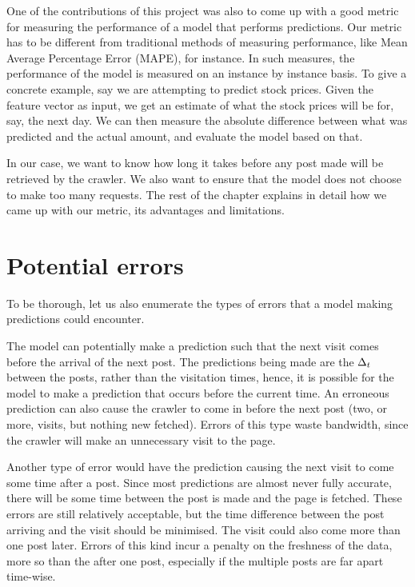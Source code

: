 One of the contributions of this project was also to come up with a good metric 
for measuring the performance of a model that performs predictions. Our metric 
has to be different from traditional methods of measuring performance, like Mean 
Average Percentage Error (MAPE), for instance. In such measures, the performance 
of the model is measured on an instance by instance basis. To give a concrete 
example, say we are attempting to predict stock prices. Given the feature vector 
as input, we get an estimate of what the stock prices will be for, say, the next 
day. We can then measure the absolute difference between what was predicted and 
the actual amount, and evaluate the model based on that.

In our case, we want to know how long it takes before any post made will be 
retrieved by the crawler. We also want to ensure that the model does not choose 
to make too many requests. The rest of the chapter explains in detail how we 
came up with our metric, its advantages and limitations.

\section{Potential errors}
To be thorough, let us also enumerate the types of errors that a model making 
predictions could encounter.

The model can potentially make a prediction such that the next visit comes 
before the arrival of the next post. The predictions being made are the $\Delta_t$ 
between the posts, rather than the visitation times, hence, it is possible for 
the model to make a prediction that occurs before the current time. An erroneous 
prediction can also cause the crawler to come in before the next post (two, or 
more, visits, but nothing new fetched). Errors of this type waste bandwidth, 
since the crawler will make an unnecessary visit to the page.

Another type of error would have the prediction causing the next visit to come 
some time after a post. Since most predictions are almost never fully accurate, 
there will be some time between the post is made and the page is fetched. These 
errors are still relatively acceptable, but the time difference between the post 
arriving and the visit should be minimised. The visit could also come more than 
one post later. Errors of this kind incur a penalty on the freshness of the 
data, more so than the after one post, especially if the multiple posts are far 
apart time-wise.

